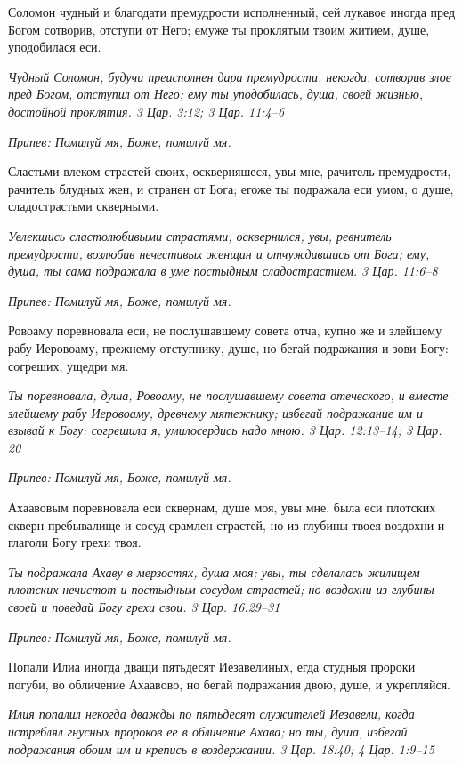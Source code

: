 Соломон чудный и благодати премудрости исполненный, сей лукавое иногда пред Богом сотворив, отступи от Него; емуже ты проклятым твоим житием, душе, уподобилася еси.


\itshape Чудный Соломон, будучи преисполнен дара премудрости, некогда, сотворив злое пред Богом, отступил от Него; ему ты уподобилась, душа, своей жизнью, достойной проклятия. 3 Цар. 3:12; 3 Цар. 11:4–6\normalfont{}


\itshape Припев:\normalfont{} Помилуй мя, Боже, помилуй мя.


Сластьми влеком страстей своих, оскверняшеся, увы мне, рачитель премудрости, рачитель блудных жен, и странен от Бога; егоже ты подражала еси умом, о душе, сладострастьми скверными.


\itshape Увлекшись сластолюбивыми страстями, осквернился, увы, ревнитель премудрости, возлюбив нечестивых женщин и отчуждившись от Бога; ему, душа, ты сама подражала в уме постыдным сладострастием. 3 Цар. 11:6–8\normalfont{}


\itshape Припев:\normalfont{} Помилуй мя, Боже, помилуй мя.


Ровоаму поревновала еси, не послушавшему совета отча, купно же и злейшему рабу Иеровоаму, прежнему отступнику, душе, но бегай подражания и зови Богу: согреших, ущедри мя.


\itshape Ты поревновала, душа, Ровоаму, не послушавшему совета отеческого, и вместе злейшему рабу Иеровоаму, древнему мятежнику; избегай подражание им и взывай к Богу: согрешила я, умилосердись надо мною. 3 Цар. 12:13–14; 3 Цар. 20\normalfont{}


\itshape Припев:\normalfont{} Помилуй мя, Боже, помилуй мя.


Ахаавовым поревновала еси сквернам, душе моя, увы мне, была еси плотских скверн пребывалище и сосуд срамлен страстей, но из глубины твоея воздохни и глаголи Богу грехи твоя.


\itshape Ты подражала Ахаву в мерзостях, душа моя; увы, ты сделалась жилищем плотских нечистот и постыдным сосудом страстей; но воздохни из глубины своей и поведай Богу грехи свои. 3 Цар. 16:29–31\normalfont{}


\itshape Припев:\normalfont{} Помилуй мя, Боже, помилуй мя.


Попали Илиа иногда дващи пятьдесят Иезавелиных, егда студныя пророки погуби, во обличение Ахаавово, но бегай подражания двою, душе, и укрепляйся.


\itshape Илия попалил некогда дважды по пятьдесят служителей Иезавели, когда истреблял гнусных пророков ее в обличение Ахава; но ты, душа, избегай подражания обоим им и крепись в воздержании. 3 Цар. 18:40; 4 Цар. 1:9–15\normalfont{}


